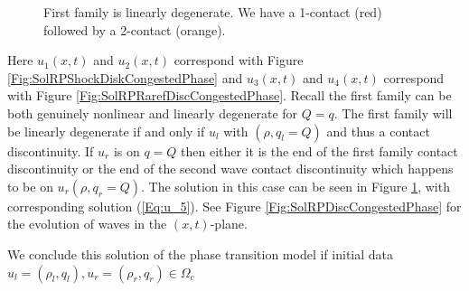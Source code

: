 \documentclass[10pt]{article}
\numberwithin{equation}{section}
\begin{document}
\begin{figure}
   
   \caption{First family is linearly degenerate. We have a 1-contact (red) followed by a 2-contact (orange).}
    \label{Fig:u_5}
\end{figure}
Here $u_1(x,t)$ and $u_2(x,t)$ correspond with Figure \ref{Fig:SolRPShockDiskCongestedPhase} and $u_3(x,t)$ and $u_4(x,t)$ correspond with Figure \ref{Fig:SolRPRarefDiscCongestedPhase}. 
Recall the first family can be both genuinely nonlinear and linearly degenerate for $Q = q$. The first family will be linearly degenerate if and only if $u_l$ with $(\rho, q_l = Q)$ and thus a contact discontinuity.  If $u_r$ is on $q = Q$ then either it is the end of the first family contact discontinuity or the end of the second wave contact discontinuity which happens to be on $u_r(\rho, q_r = Q)$. The solution in this case can be seen in Figure \ref{Fig:u_5}, with corresponding solution (\ref{Eq:u_5}). See Figure \ref{Fig:SolRPDiscCongestedPhase} for the evolution of waves in the $(x,t)$-plane.

We conclude this solution of the phase transition model if initial data $u_l = (\rho_l, q_l), u_r = (\rho_r, q_r) \in \Omega_c $
\end{document}
